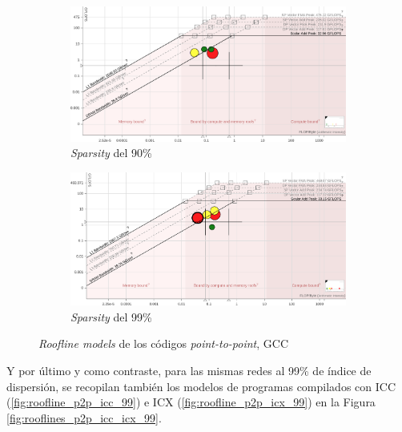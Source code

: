 \begin{figure}[htpb]
    \centering
    \begin{subfigure}[b]{0.495\textwidth}
        \includegraphics[width=\textwidth]{img/rooflines/roofline_p2p_90.png}
        \caption{\textit{Sparsity} del 90\%}
        \label{fig:roofline_p2p_gcc_90}
    \end{subfigure}
    \begin{subfigure}[b]{0.495\textwidth}
        \includegraphics[width=\textwidth]{img/rooflines/roofline_p2p_99.png}
        \caption{\textit{Sparsity} del 99\%}
        \label{fig:roofline_p2p_gcc_99}
    \end{subfigure}

    \caption{\textit{Roofline models} de los códigos \textit{point-to-point}, GCC}
    \label{fig:rooflines_p2p_gcc_90_99}
\end{figure}

Y por último y como contraste, para las mismas redes al 99\% de índice de dispersión, se recopilan también los modelos de programas compilados con ICC (\ref{fig:roofline_p2p_icc_99}) e ICX (\ref{fig:roofline_p2p_icx_99}) en la Figura \ref{fig:rooflines_p2p_icc_icx_99}.

